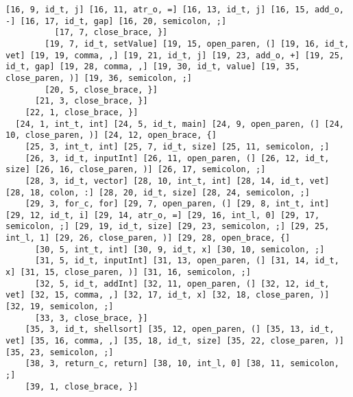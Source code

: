 \documentclass[12pt, a4paper]{memoir}
\begin{document}
\begin{lstlisting}[style=result]
          [16, 9, id_t, j] [16, 11, atr_o, =] [16, 13, id_t, j] [16, 15, add_o, -] [16, 17, id_t, gap] [16, 20, semicolon, ;]
          [17, 7, close_brace, }]
        [19, 7, id_t, setValue] [19, 15, open_paren, (] [19, 16, id_t, vet] [19, 19, comma, ,] [19, 21, id_t, j] [19, 23, add_o, +] [19, 25, id_t, gap] [19, 28, comma, ,] [19, 30, id_t, value] [19, 35, close_paren, )] [19, 36, semicolon, ;]
        [20, 5, close_brace, }]
      [21, 3, close_brace, }]
    [22, 1, close_brace, }]
  [24, 1, int_t, int] [24, 5, id_t, main] [24, 9, open_paren, (] [24, 10, close_paren, )] [24, 12, open_brace, {]
    [25, 3, int_t, int] [25, 7, id_t, size] [25, 11, semicolon, ;]
    [26, 3, id_t, inputInt] [26, 11, open_paren, (] [26, 12, id_t, size] [26, 16, close_paren, )] [26, 17, semicolon, ;]
    [28, 3, id_t, vector] [28, 10, int_t, int] [28, 14, id_t, vet] [28, 18, colon, :] [28, 20, id_t, size] [28, 24, semicolon, ;]
    [29, 3, for_c, for] [29, 7, open_paren, (] [29, 8, int_t, int] [29, 12, id_t, i] [29, 14, atr_o, =] [29, 16, int_l, 0] [29, 17, semicolon, ;] [29, 19, id_t, size] [29, 23, semicolon, ;] [29, 25, int_l, 1] [29, 26, close_paren, )] [29, 28, open_brace, {]
      [30, 5, int_t, int] [30, 9, id_t, x] [30, 10, semicolon, ;]
      [31, 5, id_t, inputInt] [31, 13, open_paren, (] [31, 14, id_t, x] [31, 15, close_paren, )] [31, 16, semicolon, ;]
      [32, 5, id_t, addInt] [32, 11, open_paren, (] [32, 12, id_t, vet] [32, 15, comma, ,] [32, 17, id_t, x] [32, 18, close_paren, )] [32, 19, semicolon, ;]
      [33, 3, close_brace, }]
    [35, 3, id_t, shellsort] [35, 12, open_paren, (] [35, 13, id_t, vet] [35, 16, comma, ,] [35, 18, id_t, size] [35, 22, close_paren, )] [35, 23, semicolon, ;]
    [38, 3, return_c, return] [38, 10, int_l, 0] [38, 11, semicolon, ;]
    [39, 1, close_brace, }]
\end{lstlisting}
\end{document}
